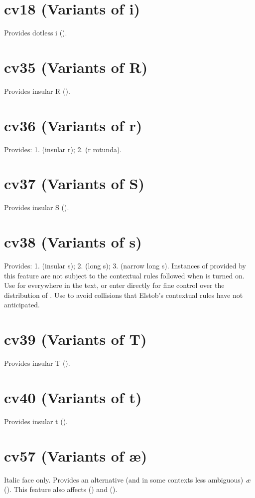 \documentclass[12pt,letterpaper,openany]{book}
\begin{document}
\section{cv18 (Variants of i)}
Provides dotless i ().

\section{cv35 (Variants of R)}
Provides insular R ().

\section{cv36 (Variants of r)}
Provides: 1.  (insular r); 2.  (r rotunda).

\section{cv37 (Variants of S)}
Provides insular S ().

\section{cv38 (Variants of s)}
Provides: 1.  (insular s); 2.  (long s);
3.  (narrow long s). Instances of \textbf{}
provided by this feature are not subject to the contextual rules followed
when  is turned on. Use  for \textbf{}
everywhere in the text, or enter  directly for fine control over the
distribution of \textbf{}. Use  to avoid collisions that
Elstob’s contextual rules have not anticipated.

\section{cv39 (Variants of T)}
Provides insular T ().

\section{cv40 (Variants of t)}
Provides insular t ().

\section{cv57 (Variants of æ)}
Italic face only. Provides an alternative (and in some contexts less ambiguous)
\textit{æ} (\textit{}).
This feature also affects  (\textit{})
and  (\textit{}).
\end{document}
